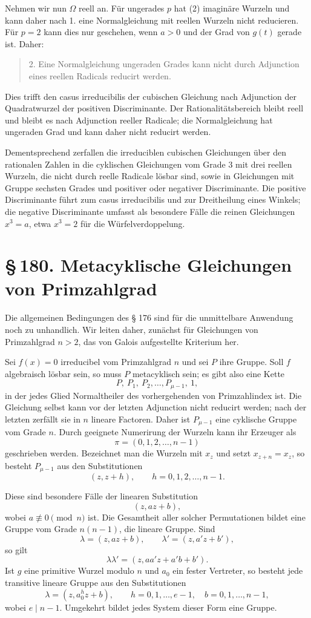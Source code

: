 \documentclass[11pt]{article}
\newcommand{\sect}[2]{\section*{\S\,#1. #2}}
\begin{document}
Nehmen wir nun $\Omega$ reell an. Für ungerades $p$ hat (2) imaginäre Wurzeln und kann daher nach 1. eine Normalgleichung mit reellen Wurzeln nicht reducieren. Für $p=2$ kann dies nur geschehen, wenn $a>0$ und der Grad von $g(t)$ gerade ist. Daher:
\begin{quote}
2. Eine Normalgleichung ungeraden Grades kann nicht durch Adjunction eines reellen Radicals reducirt werden.
\end{quote}

Dies trifft den casus irreducibilis der cubischen Gleichung nach Adjunction der Quadratwurzel der positiven Discriminante. Der Rationalitätsbereich bleibt reell und bleibt es nach Adjunction reeller Radicale; die Normalgleichung hat ungeraden Grad und kann daher nicht reducirt werden.

Dementsprechend zerfallen die irreduciblen cubischen Gleichungen über den rationalen Zahlen in die cyklischen Gleichungen vom Grade $3$ mit drei reellen Wurzeln, die nicht durch reelle Radicale lösbar sind, sowie in Gleichungen mit Gruppe sechsten Grades und positiver oder negativer Discriminante. Die positive Discriminante führt zum casus irreducibilis und zur Dreitheilung eines Winkels; die negative Discriminante umfasst als besondere Fälle die reinen Gleichungen $x^3=a$, etwa $x^3=2$ für die Würfelverdoppelung.

\sect{180}{Metacyklische Gleichungen von Primzahlgrad}

Die allgemeinen Bedingungen des § 176 sind für die unmittelbare Anwendung noch zu unhandlich. Wir leiten daher, zunächst für Gleichungen von Primzahlgrad $n>2$, das von Galois aufgestellte Kriterium her.

Sei $f(x)=0$ irreducibel vom Primzahlgrad $n$ und sei $P$ ihre Gruppe. Soll $f$ algebraisch lösbar sein, so muss $P$ metacyklisch sein; es gibt also eine Kette
\[
  P,\ P_1,\ P_2,\ldots, P_{\mu-1},\ 1,                         \tag{1}
\]
in der jedes Glied Normaltheiler des vorhergehenden von Primzahlindex ist. Die Gleichung selbst kann vor der letzten Adjunction nicht reducirt werden; nach der letzten zerfällt sie in $n$ lineare Factoren. Daher ist $P_{\mu-1}$ eine cyklische Gruppe vom Grade $n$. Durch geeignete Numerirung der Wurzeln kann ihr Erzeuger als
\[
  \pi=(0,1,2,\ldots,n-1)
\]
geschrieben werden. Bezeichnet man die Wurzeln mit $x_z$ und setzt $x_{z+n}=x_z$, so besteht $P_{\mu-1}$ aus den Substitutionen
\[
  (z,z+h),\qquad h=0,1,2,\ldots,n-1.                            \tag{2}
\]

Diese sind besondere Fälle der linearen Substitution
\[
  (z,az+b),                                                     \tag{3}
\]
wobei $a\not\equiv0\pmod n$ ist. Die Gesamtheit aller solcher Permutationen bildet eine Gruppe vom Grade $n(n-1)$, die lineare Gruppe. Sind
\[
  \lambda=(z,az+b),\qquad \lambda'=(z,a'z+b'),
\]
so gilt
\[
  \lambda\lambda'=(z,aa'z+a'b+b').                              \tag{4}
\]
Ist $g$ eine primitive Wurzel modulo $n$ und $a_0$ ein fester Vertreter, so besteht jede transitive lineare Gruppe aus den Substitutionen
\[
  \lambda=(z,a_0^h z+b),\qquad h=0,1,\ldots,e-1,
  \quad b=0,1,\ldots,n-1,                                      \tag{5}
\]
wobei $e\mid n-1$. Umgekehrt bildet jedes System dieser Form eine Gruppe.
\end{document}
